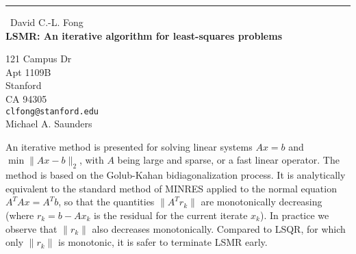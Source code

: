 \documentclass{report}
\begin{document}
\begin{center}
\rule{6in}{1pt} \
{\large David C.-L. Fong \\
{\bf LSMR: An iterative algorithm for least-squares problems}}

121 Campus Dr  \\ Apt 1109B \\ Stanford \\ CA 94305
\\
{\tt clfong@stanford.edu}\\
Michael A. Saunders\end{center}

\newcommand{\T}{^T\!}
\newcommand{\norm}[1]{\|#1\|}


An iterative method is presented for solving linear systems $Ax=b$ and
$\min \norm{Ax-b}_2$, with $A$ being large and sparse, or a fast linear
operator. The method is based on the Golub-Kahan bidiagonalization
process. It is analytically equivalent to the standard method of MINRES
applied to the normal equation $A\T Ax = A\T b$, so that the quantities
$\norm{A\T r_k}$ are monotonically decreasing (where $r_k = b - Ax_k$ is
the residual for the current iterate $x_k$). In practice we observe that
$\norm{r_k}$ also decreases monotonically. Compared to LSQR, for which
only $\norm{r_k}$ is monotonic, it is safer to terminate LSMR early.
\end{document}
